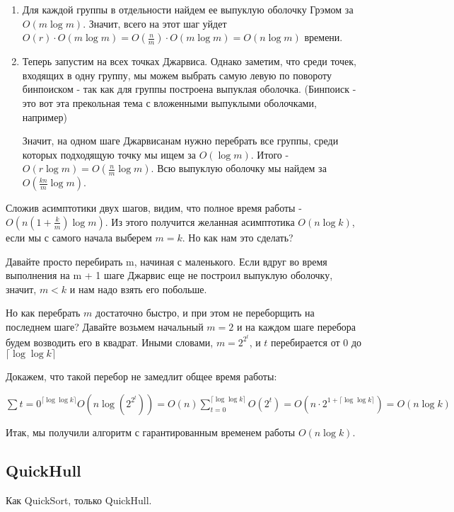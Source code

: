 \documentclass[11pt]{article}
\begin{document}
\begin{enumerate}
\item Для каждой группы в отдельности найдем ее выпуклую оболочку Грэмом за \(O(m \log m)\).
Значит, всего на этот шаг уйдет
\(O(r) \cdot O(m \log m) = O(\frac{n}{m}) \cdot O(m \log m) = O(n \log m)\) времени.
\item Теперь запустим на всех точках Джарвиса. Однако заметим, что среди точек, входящих в одну
группу, мы можем выбрать самую левую по повороту бинпоиском - так как для группы построена
выпуклая оболочка. (Бинпоиск - это вот эта прекольная тема с вложенными выпуклыми оболочками, например)

Значит, на одном шаге Джарвисанам нужно перебрать все группы, среди которых подходящую точку мы ищем за \(O(\log m)\).
Итого - \(O(r \log m) = O(\frac{n}{m} \log m)\). Всю выпуклую оболочку мы найдем за \(O(\frac{kn}{m} \log m)\).
\end{enumerate}

Сложив асимптотики двух шагов, видим, что полное время работы - \(O(n (1 + \frac{k}{m}) \log m)\). Из этого
получится желанная асимптотика \(O(n \log k)\), если мы с самого начала выберем \(m = k\). Но как нам это сделать?

Давайте просто перебирать m, начиная с маленького. Если вдруг во время выполнения на m + 1 шаге Джарвис
еще не построил выпуклую оболочку, значит, \(m < k\) и нам надо взять его побольше.

Но как перебрать \(m\) достаточно быстро, и при этом не переборщить на последнем шаге?
Давайте возьмем начальный \(m = 2\) и на каждом шаге перебора будем возводить его в квадрат.
Иными словами, \(m = 2^{2^t}\), и \(t\) перебирается от 0 до \(\lceil \log\log k \rceil\)

Докажем, что такой перебор не замедлит общее время работы:

\(\sum\limits {t=0}^{\lceil \log\log k \rceil} O\left(n \log(2^{2^t})\right) = O(n) \sum\limits_{t=0}^{\lceil \log\log k \rceil} O(2^t) = O\left(n \cdot 2^{1+\lceil \log\log k \rceil}\right) = O(n \log k)\)

Итак, мы получили алгоритм с гарантированным временем работы \(O(n \log k)\).

\subsection{{\bfseries{}} QuickHull}
\label{sec:orgheadline26}
Как QuickSort, только QuickHull.
\end{document}
